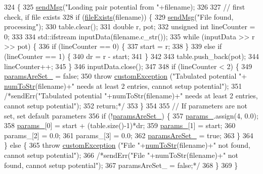 \begin{DoxyCode}
324                                                 \{
325     \hyperlink{utilities_8cpp_a08974c73a5b36c28b8ad1ef47fca77b0}{sendMsg}(\textcolor{stringliteral}{"Loading pair potential from "}+filename);
326 
327     \textcolor{comment}{// first check, if file exists}
328     \textcolor{keywordflow}{if} (\hyperlink{utilities_8cpp_a9d1e3672fd331d4185c1763c80226307}{fileExists}(filename)) \{
329         \hyperlink{utilities_8cpp_a08974c73a5b36c28b8ad1ef47fca77b0}{sendMsg}(\textcolor{stringliteral}{"File found, processing"});
330         table.clear();
331         \textcolor{keywordtype}{double} r, pot;
332         \textcolor{keywordtype}{unsigned} \textcolor{keywordtype}{int} lineCounter = 0;
333 
334         std::ifstream inputData(filename.c\_str());
335         \textcolor{keywordflow}{while} (inputData >> r >> pot) \{
336             \textcolor{keywordflow}{if} (lineCounter == 0) \{
337                 start = r;
338             \}
339             \textcolor{keywordflow}{else} \textcolor{keywordflow}{if} (lineCounter == 1) \{
340                 dr = r - start;
341             \}
342 
343             table.push\_back(pot);
344             lineCounter++;
345         \}
346         inputData.close();
347 
348         \textcolor{keywordflow}{if} (lineCounter < 2) \{
349             \hyperlink{classpair_potential_a635755c0a952bfc05a4cfae230c3dbd2}{paramsAreSet\_} = \textcolor{keyword}{false};
350             \textcolor{keywordflow}{throw} \hyperlink{classcustom_exception}{customException} (\textcolor{stringliteral}{"Tabulated potential "}+
      \hyperlink{utilities_8h_ae6ed8fadf719af789711a7c0e99f44bc}{numToStr}(filename)+\textcolor{stringliteral}{" needs at least 2 entries, cannot setup potential"});
351             \textcolor{comment}{/*sendErr("Tabulated potential "+numToStr(filename)+" needs at least 2 entries, cannot setup
       potential");}
352 \textcolor{comment}{            return;*/}
353         \}
354 
355         \textcolor{comment}{// If parameters are not set, set default parameters}
356         \textcolor{keywordflow}{if} (!\hyperlink{classpair_potential_a635755c0a952bfc05a4cfae230c3dbd2}{paramsAreSet\_}) \{
357             \hyperlink{classpair_potential_abf8ec8af983d6e9960bd149da099e883}{params\_}.assign(4, 0.0);
358             \hyperlink{classpair_potential_abf8ec8af983d6e9960bd149da099e883}{params\_}[0] = start + (table.size()-1)*dr;
359             \hyperlink{classpair_potential_abf8ec8af983d6e9960bd149da099e883}{params\_}[1] = start;
360             params\_[2] = 0.0;
361             params\_[3] = 0.0;
362             \hyperlink{classpair_potential_a635755c0a952bfc05a4cfae230c3dbd2}{paramsAreSet\_} = \textcolor{keyword}{true};
363         \}
364     \} \textcolor{keywordflow}{else} \{
365         \textcolor{keywordflow}{throw} \hyperlink{classcustom_exception}{customException} (\textcolor{stringliteral}{"File "}+\hyperlink{utilities_8h_ae6ed8fadf719af789711a7c0e99f44bc}{numToStr}(filename)+\textcolor{stringliteral}{" not found, cannot setup
       potential"});
366         \textcolor{comment}{/*sendErr("File "+numToStr(filename)+" not found, cannot setup potential");}
367 \textcolor{comment}{        paramsAreSet\_ = false;*/}
368     \}
369 \}
\end{DoxyCode}
